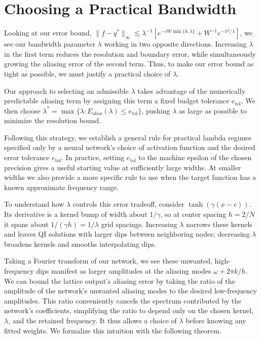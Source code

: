 \documentclass[11pt]{article}
\begin{document}
\section{Choosing a Practical Bandwidth}
\label{sec:choosing-lambda}

Looking at our error bound,
\(\|f-q^*\|_\infty\lesssim\lambda^{-1}[e^{-cW\min\{\delta,\lambda\}}+W^{-1}e^{-\pi^2/\lambda}]\),
we see our bandwidth parameter \(\lambda\) working in two opposite directions.
Increasing \(\lambda\) in the first term reduces the resolution and boundary
error, while simultaneously growing the aliasing error of the second term.
Thus, to make our error bound as tight as possible, we must justify a practical
choice of \(\lambda\).

Our approach to selecting an admissible \(\lambda\) takes advantage of the
numerically predictable aliasing term by assigning this term a fixed budget
tolerance \(e_{\mathrm{tol}}\). We then choose
\(\lambda^*=\max\{\lambda:E_{\mathrm{alias}}(\lambda)\le e_{\mathrm{tol}}\}\),
pushing \(\lambda\) as large as possible to minimize the resolution bound.

Following this strategy, we establish a general rule for practical lambda
regimes specified only by a neural network's choice of activation function and
the desired error tolerance \(e_{\mathrm{tol}}\). In practice, setting
\(e_{\mathrm{tol}}\) to the machine epsilon of the chosen precision gives a
useful starting value at sufficiently large widths. At smaller widths we also
provide a more specific rule to use when the target function has a known
approximate frequency range.

To understand how \(\lambda\) controls this error tradeoff, consider
\(\tanh(\gamma(x-c))\). Its derivative is a kernel bump of width about
\(1/\gamma\), so at center spacing \(h=2/N\) it spans about
\(1/(\gamma h)=1/\lambda\) grid spacings. Increasing \(\lambda\) narrows these
kernels and leaves QI solutions with larger dips between neighboring nodes;
decreasing \(\lambda\) broadens kernels and smooths interpolating dips.

Taking a Fourier transform of our network, we see these unwanted,
high-frequency dips manifest as larger amplitudes at the aliasing modes
\(\omega+2\pi k/h\). We can bound the lattice output's aliasing error by taking
the ratio of the amplitude of the network's unwanted aliasing modes to the
desired low-frequency amplitudes. This ratio conveniently cancels the spectrum
contributed by the network's coefficients, simplifying the ratio to depend
only on the chosen kernel, \(\lambda\), and the retained frequency. It thus
allows a choice of \(\lambda\) before knowing any fitted weights. We formalize
this intuition with the following theorem.
\end{document}
